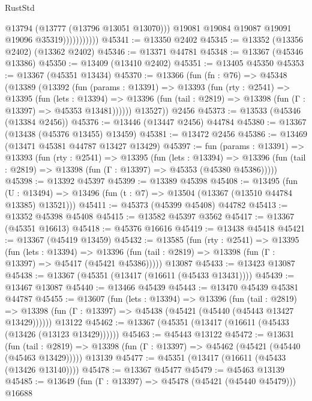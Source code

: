 \begin{lexlean}{RustStd}
\begin{coremodule}
                            @13794
                            (@13777 (@13796 @13051 @13070)))
                          @19081
                          @19084
                          @19087
                          @19091
                          @19096
                          @35319)))))))))))
@45341 := @13350 @2402
@45345 := @13352 (@13356 @2402) (@13362 @2402)
@45346 := @13371 @44781
@45348 := @13367 (@45346 @13386)
@45350 := @13409 (@13410 @2402)
@45351 := @13405 @45350
@45353 := @13367 (@45351 @13434)
@45370 := @13366
    (fun (fn : @76) =>
    @45348
      (@13389
        (@13392
          (fun (params : @13391) =>
          @13393
            (fun (rty : @2541) =>
            @13395
              (fun (lets : @13394) =>
              @13396 (fun (tail : @2819) => @13398 (fun (Γ : @13397) => @45353 @13481))))))
        @13527))
    @2456
@45373 := @13533 (@45346 (@13384 @2456))
@45376 := @13446 (@13447 @2456) @44784
@45380 := @13367 (@13438 (@45376 @13455) @13459)
@45381 := @13472 @2456
@45386 := @13469 (@13471 @45381 @44787 @13427 @13429)
@45397 := fun (params : @13391) =>
  @13393
    (fun (rty : @2541) =>
    @13395
      (fun (lets : @13394) =>
      @13396 (fun (tail : @2819) => @13398 (fun (Γ : @13397) => @45353 (@45380 @45386)))))
@45398 := @13392 @45397
@45399 := @13389 @45398
@45408 := @13495
    (fun (U : @13494) => @13496 (fun (t : @7) => @13504 (@13367 (@13510 @44784 @13385) @13521)))
@45411 := @45373 (@45399 @45408) @44782
@45413 := @13352 @45398 @45408
@45415 := @13582 @45397 @3562
@45417 := @13367 (@45351 @16613)
@45418 := @45376 @16616
@45419 := @13438 @45418
@45421 := @13367 (@45419 @13459)
@45432 := @13585
    (fun (rty : @2541) =>
    @13395
      (fun (lets : @13394) =>
      @13396 (fun (tail : @2819) => @13398 (fun (Γ : @13397) => @45417 (@45421 @45386)))))
    @13087
@45433 := @13423 @13087
@45438 := @13367 (@45351 (@13417 (@16611 (@45433 @13431))))
@45439 := @13467 @13087
@45440 := @13466 @45439
@45443 := @13470 @45439 @45381 @44787
@45455 := @13607
    (fun (lets : @13394) =>
    @13396
      (fun (tail : @2819) =>
      @13398 (fun (Γ : @13397) => @45438 (@45421 (@45440 (@45443 @13427 @13429))))))
    @13122
@45462 := @13367 (@45351 (@13417 (@16611 (@45433 (@13426 (@13123 @13429))))))
@45463 := @45443 @13122
@45472 := @13631
    (fun (tail : @2819) => @13398 (fun (Γ : @13397) => @45462 (@45421 (@45440 (@45463 @13429)))))
    @13139
@45477 := @45351 (@13417 (@16611 (@45433 (@13426 @13140))))
@45478 := @13367 @45477
@45479 := @45463 @13139
@45485 := @13649 (fun (Γ : @13397) => @45478 (@45421 (@45440 @45479))) @16688

\end{coremodule}
\end{lexlean}
